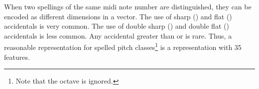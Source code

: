 
When two spellings of the same \gls{midi} note number are
distinguished, they can be encoded as different dimensions
in a vector. The use of sharp (\musSharp{}) and flat
(\musFlat{}) accidentals is very common. The use of double
sharp (\musDoubleSharp{}) and double flat (\musDoubleFlat{})
accidentals is less common. Any accidental greater than
\musDoubleSharp{} or \musDoubleFlat{} is rare. Thus, a
reasonable representation for spelled pitch
classes\footnote{Note that the octave is ignored.} is a
representation with 35 features.

